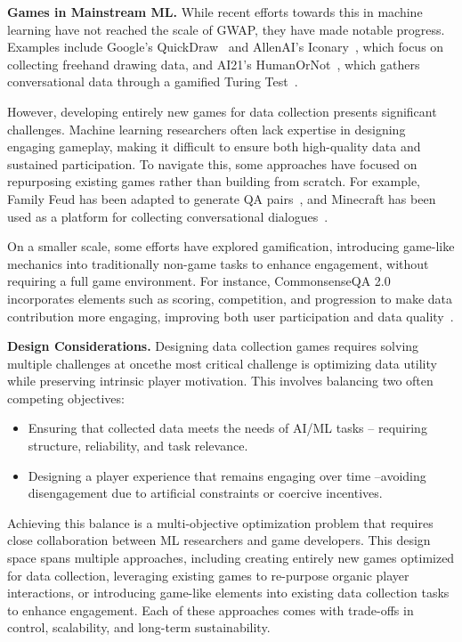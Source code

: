 \textbf{Games in Mainstream ML.} While recent efforts towards this in machine learning have not reached the scale of GWAP, they have made notable progress. Examples include Google's QuickDraw~\cite{ha2017neural} and AllenAI's Iconary~\cite{clark2021iconary}, which focus on collecting freehand drawing data, and AI21's HumanOrNot~\cite{jannai2023human}, which gathers conversational data through a gamified Turing Test~\cite{dugan2023real}.

However, developing entirely new games for data collection presents significant challenges. Machine learning researchers often lack expertise in designing engaging gameplay, making it difficult to ensure both high-quality data and sustained participation. To navigate this, some approaches have focused on repurposing existing games rather than building from scratch. For example, Family Feud has been adapted to generate QA pairs~\cite{boratko2020protoqa}, and Minecraft has been used as a platform for collecting conversational dialogues~\cite{narayan2019collaborative}.

On a smaller scale, some efforts have explored gamification, introducing game-like mechanics into traditionally non-game tasks to enhance engagement, without requiring a full game environment. For instance, CommonsenseQA 2.0 incorporates elements such as scoring, competition, and progression to make data contribution more engaging, improving both user participation and data quality~\cite{talmor2022commonsenseqa}.

\textbf{Design Considerations.} Designing data collection games requires solving multiple challenges at once\textemdash{}the most critical challenge is optimizing data utility while preserving intrinsic player motivation. This involves balancing two often competing objectives:
\begin{itemize}[left=0cm]
    \item Ensuring that collected data meets the needs of AI/ML tasks -- requiring structure, reliability, and task relevance.
    \item Designing a player experience that remains engaging over time --avoiding disengagement due to artificial constraints or coercive incentives.
\end{itemize}
Achieving this balance is a multi-objective optimization problem that requires close collaboration between ML researchers and game developers. This design space spans multiple approaches, including creating entirely new games optimized for data collection, leveraging existing games to re-purpose organic player interactions, or introducing game-like elements into existing data collection tasks to enhance engagement. Each of these approaches comes with trade-offs in control, scalability, and long-term sustainability.

